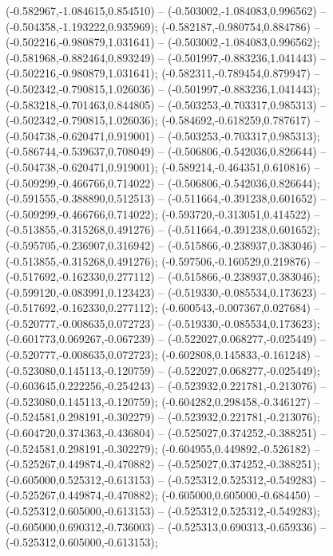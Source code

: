  (-0.582967,-1.084615,0.854510) -- (-0.503002,-1.084083,0.996562) -- (-0.504358,-1.193222,0.935969);
 (-0.582187,-0.980754,0.884786) -- (-0.502216,-0.980879,1.031641) -- (-0.503002,-1.084083,0.996562);
 (-0.581968,-0.882464,0.893249) -- (-0.501997,-0.883236,1.041443) -- (-0.502216,-0.980879,1.031641);
 (-0.582311,-0.789454,0.879947) -- (-0.502342,-0.790815,1.026036) -- (-0.501997,-0.883236,1.041443);
 (-0.583218,-0.701463,0.844805) -- (-0.503253,-0.703317,0.985313) -- (-0.502342,-0.790815,1.026036);
 (-0.584692,-0.618259,0.787617) -- (-0.504738,-0.620471,0.919001) -- (-0.503253,-0.703317,0.985313);
 (-0.586744,-0.539637,0.708049) -- (-0.506806,-0.542036,0.826644) -- (-0.504738,-0.620471,0.919001);
 (-0.589214,-0.464351,0.610816) -- (-0.509299,-0.466766,0.714022) -- (-0.506806,-0.542036,0.826644);
 (-0.591555,-0.388890,0.512513) -- (-0.511664,-0.391238,0.601652) -- (-0.509299,-0.466766,0.714022);
 (-0.593720,-0.313051,0.414522) -- (-0.513855,-0.315268,0.491276) -- (-0.511664,-0.391238,0.601652);
 (-0.595705,-0.236907,0.316942) -- (-0.515866,-0.238937,0.383046) -- (-0.513855,-0.315268,0.491276);
 (-0.597506,-0.160529,0.219876) -- (-0.517692,-0.162330,0.277112) -- (-0.515866,-0.238937,0.383046);
 (-0.599120,-0.083991,0.123423) -- (-0.519330,-0.085534,0.173623) -- (-0.517692,-0.162330,0.277112);
 (-0.600543,-0.007367,0.027684) -- (-0.520777,-0.008635,0.072723) -- (-0.519330,-0.085534,0.173623);
 (-0.601773,0.069267,-0.067239) -- (-0.522027,0.068277,-0.025449) -- (-0.520777,-0.008635,0.072723);
 (-0.602808,0.145833,-0.161248) -- (-0.523080,0.145113,-0.120759) -- (-0.522027,0.068277,-0.025449);
 (-0.603645,0.222256,-0.254243) -- (-0.523932,0.221781,-0.213076) -- (-0.523080,0.145113,-0.120759);
 (-0.604282,0.298458,-0.346127) -- (-0.524581,0.298191,-0.302279) -- (-0.523932,0.221781,-0.213076);
 (-0.604720,0.374363,-0.436804) -- (-0.525027,0.374252,-0.388251) -- (-0.524581,0.298191,-0.302279);
 (-0.604955,0.449892,-0.526182) -- (-0.525267,0.449874,-0.470882) -- (-0.525027,0.374252,-0.388251);
 (-0.605000,0.525312,-0.613153) -- (-0.525312,0.525312,-0.549283) -- (-0.525267,0.449874,-0.470882);
 (-0.605000,0.605000,-0.684450) -- (-0.525312,0.605000,-0.613153) -- (-0.525312,0.525312,-0.549283);
 (-0.605000,0.690312,-0.736003) -- (-0.525313,0.690313,-0.659336) -- (-0.525312,0.605000,-0.613153);
